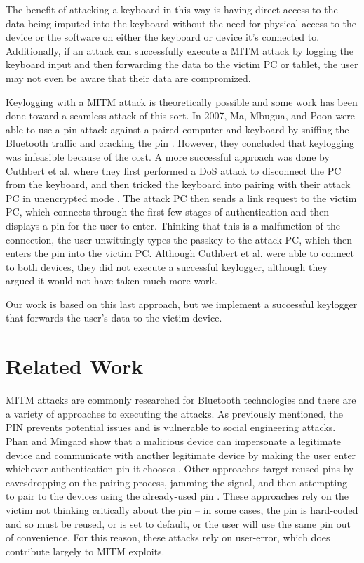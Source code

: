 \documentclass{acm_proc_article-sp}
\begin{document}
The benefit of attacking a keyboard in this way is having direct access to the data being imputed into the keyboard without the need for physical access to the device or the software on either the keyboard or device it's connected to. Additionally, if an attack can successfully execute a MITM attack by logging the keyboard input and then forwarding the data to the victim PC or tablet, the user may not even be aware that their data are compromized. 

Keylogging with a MITM attack is theoretically possible and some work has been done toward a seamless attack of this sort. In 2007, Ma, Mbugua, and Poon were able to use a pin attack against a paired computer and keyboard by sniffing the Bluetooth traffic and cracking the pin \cite{ma2007keystroke}. However, they concluded that keylogging was infeasible because of the cost. A more successful approach was done by Cuthbert et al. where they first performed a DoS attack to disconnect the PC from the keyboard, and then tricked the keyboard into pairing with their attack PC in unencrypted mode \cite{cuthbertbluetooth}. The attack PC then sends a link request to the victim PC, which connects through the first few stages of authentication and then displays a pin for the user to enter. Thinking that this is a malfunction of the connection, the user unwittingly types the passkey to the attack PC, which then enters the pin into the victim PC. Although Cuthbert et al. were able to connect to both devices, they did not execute a successful keylogger, although they argued it would not have taken much more work. 

Our work is based on this last approach, but we implement a successful keylogger that forwards the user's data to the victim device.

\section{Related Work}
MITM attacks are commonly researched for Bluetooth technologies and there are a variety of approaches to executing the attacks. As previously mentioned, the PIN prevents potential issues and is vulnerable to social engineering attacks. Phan and Mingard show that a malicious device can impersonate a legitimate device and communicate with another legitimate device by making the user enter whichever authentication pin it chooses \cite{phan2012analyzing}. Other approaches target reused pins by eavesdropping on the pairing process, jamming the signal, and then attempting to pair to the devices using the already-used pin \cite{barnickel2012implementing}. These approaches rely on the victim not thinking critically about the pin -- in some cases, the pin is hard-coded and so must be reused, or is set to default, or the user will use the same pin out of convenience. For this reason, these attacks rely on user-error, which does contribute largely to MITM exploits.  
\end{document}
